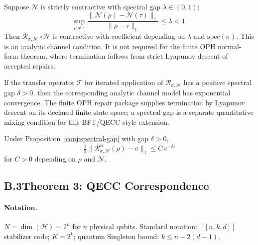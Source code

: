 \begin{proposition}
\label{prop:petz-contraction}
Suppose $\mathcal{N}$ is strictly contractive with spectral gap
$\lambda\in(0,1)$:
\[
  \sup_{\rho\neq\tau}
  \frac{\|\mathcal{N}(\rho)-\mathcal{N}(\tau)\|_1}
       {\|\rho-\tau\|_1}
  \leq\lambda<1.
\]
Then $\mathcal{R}_{\sigma,\mathcal{N}}\circ\mathcal{N}$ is contractive
with coefficient depending on $\lambda$ and $\mathrm{spec}(\sigma)$.
This is an analytic channel condition. It is not required for the finite OPH normal-form theorem,
where termination follows from strict Lyapunov descent of accepted repairs.
\end{proposition}

\begin{proposition}
\label{conj:spectral-gap}
If the transfer operator $\mathcal{T}$ for iterated application of
$\mathcal{R}_{\sigma,\mathcal{N}}$ has a positive spectral gap
$\delta>0$, then the corresponding analytic channel model has exponential convergence. The
finite OPH repair package supplies termination by Lyapunov descent on its declared finite state
space; a spectral gap is a separate quantitative mixing condition for this BFT/QECC-style
extension.
\end{proposition}

\begin{theorem}
\label{thm:exp-convergence}
Under Proposition~\ref{conj:spectral-gap} with gap $\delta>0$,
\[
  \tfrac12\bigl\|\mathcal{R}_{\sigma,\mathcal{N}}^{\circ t}(\rho)
  -\sigma\bigr\|_1
  \leq C\,e^{-\delta t}
\]
for $C>0$ depending on $\rho$ and $\mathcal{N}$.
\end{theorem}

\subsection*{B.3\quad Theorem 3: QECC Correspondence}

\paragraph{Notation.}
$N=\dim(\mathcal{H})=2^n$ for $n$ physical qubits.
Standard notation: $[[n,k,d]]$ stabilizer code; $K=2^k$; quantum
Singleton bound: $k\leq n-2(d-1)$.

